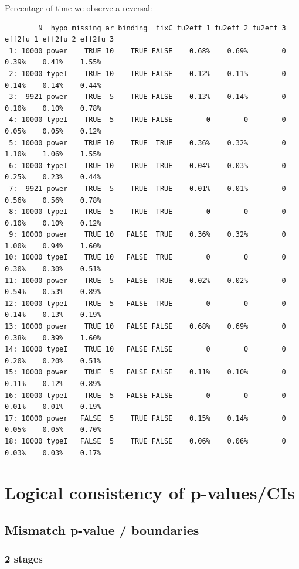 \documentclass[12pt]{article}
\begin{document}
Percentage of time we observe a reversal:
\begin{verbatim}
        N  hypo missing ar binding  fixC fu2eff_1 fu2eff_2 fu2eff_3 eff2fu_1 eff2fu_2 eff2fu_3
 1: 10000 power    TRUE 10    TRUE FALSE    0.68%    0.69%        0    0.39%    0.41%    1.55%
 2: 10000 typeI    TRUE 10    TRUE FALSE    0.12%    0.11%        0    0.14%    0.14%    0.44%
 3:  9921 power    TRUE  5    TRUE FALSE    0.13%    0.14%        0    0.10%    0.10%    0.78%
 4: 10000 typeI    TRUE  5    TRUE FALSE        0        0        0    0.05%    0.05%    0.12%
 5: 10000 power    TRUE 10    TRUE  TRUE    0.36%    0.32%        0    1.10%    1.06%    1.55%
 6: 10000 typeI    TRUE 10    TRUE  TRUE    0.04%    0.03%        0    0.25%    0.23%    0.44%
 7:  9921 power    TRUE  5    TRUE  TRUE    0.01%    0.01%        0    0.56%    0.56%    0.78%
 8: 10000 typeI    TRUE  5    TRUE  TRUE        0        0        0    0.10%    0.10%    0.12%
 9: 10000 power    TRUE 10   FALSE  TRUE    0.36%    0.32%        0    1.00%    0.94%    1.60%
10: 10000 typeI    TRUE 10   FALSE  TRUE        0        0        0    0.30%    0.30%    0.51%
11: 10000 power    TRUE  5   FALSE  TRUE    0.02%    0.02%        0    0.54%    0.53%    0.89%
12: 10000 typeI    TRUE  5   FALSE  TRUE        0        0        0    0.14%    0.13%    0.19%
13: 10000 power    TRUE 10   FALSE FALSE    0.68%    0.69%        0    0.38%    0.39%    1.60%
14: 10000 typeI    TRUE 10   FALSE FALSE        0        0        0    0.20%    0.20%    0.51%
15: 10000 power    TRUE  5   FALSE FALSE    0.11%    0.10%        0    0.11%    0.12%    0.89%
16: 10000 typeI    TRUE  5   FALSE FALSE        0        0        0    0.01%    0.01%    0.19%
17: 10000 power   FALSE  5    TRUE FALSE    0.15%    0.14%        0    0.05%    0.05%    0.70%
18: 10000 typeI   FALSE  5    TRUE FALSE    0.06%    0.06%        0    0.03%    0.03%    0.17%
\end{verbatim}


\clearpage

\section{Logical consistency of p-values/CIs}
\label{sec:org212961d}

\subsection{Mismatch p-value / boundaries}
\label{sec:org9d927a6}
\subsubsection{2 stages}
\label{sec:orgb3eaca8}
\end{document}
